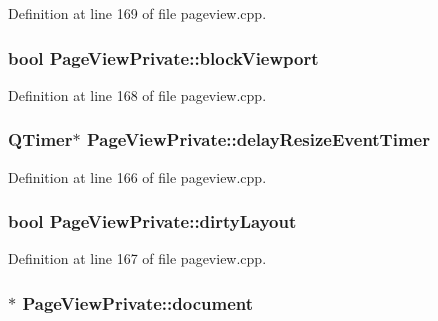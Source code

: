 Definition at line 169 of file pageview.\+cpp.

\hypertarget{classPageViewPrivate_a3d7de95f519e1c4e836d7b5876b2042b}{
\subsubsection[{block\+Viewport}]{\setlength{\rightskip}{0pt plus 5cm}bool Page\+View\+Private\+::block\+Viewport}}\label{classPageViewPrivate_a3d7de95f519e1c4e836d7b5876b2042b}


Definition at line 168 of file pageview.\+cpp.

\hypertarget{classPageViewPrivate_a65c32086d23fd9e7fa3bd4256e7f2788}{
\subsubsection[{delay\+Resize\+Event\+Timer}]{\setlength{\rightskip}{0pt plus 5cm}Q\+Timer$\ast$ Page\+View\+Private\+::delay\+Resize\+Event\+Timer}}\label{classPageViewPrivate_a65c32086d23fd9e7fa3bd4256e7f2788}


Definition at line 166 of file pageview.\+cpp.

\hypertarget{classPageViewPrivate_a2acaf067a43d2fae544738ceac1f7ed6}{
\subsubsection[{dirty\+Layout}]{\setlength{\rightskip}{0pt plus 5cm}bool Page\+View\+Private\+::dirty\+Layout}}\label{classPageViewPrivate_a2acaf067a43d2fae544738ceac1f7ed6}


Definition at line 167 of file pageview.\+cpp.

\hypertarget{classPageViewPrivate_a50645b9853306cffd74e51efb677e5b4}{
\subsubsection[{document}]{$\ast$ Page\+View\+Private\+::document}}\label{classPageViewPrivate_a50645b9853306cffd74e51efb677e5b4}


